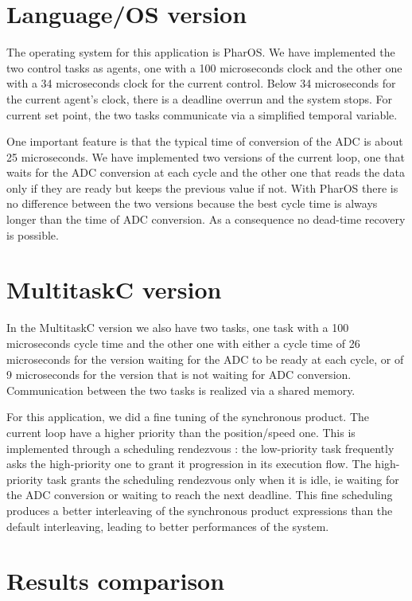\documentclass[10pt]{report}
\begin{document}
\section{Language/OS version}

The operating system for this application is PharOS. We have implemented the two control tasks as agents,
one with a 100 microseconds clock and the other one with a 34 microseconds clock for the current control. 
Below 34 microseconds for the current agent's clock, there is a deadline overrun and the system stops. 
For current set point, the two tasks communicate via a simplified temporal variable.

One important feature is that the typical time of conversion of the ADC is about 25 microseconds. We
have implemented two versions of the current loop, one that waits for the ADC conversion at each cycle
and the other one that reads the data only if they are ready but keeps the previous value if not. With
PharOS there is no difference between the two versions because the best cycle time is always longer than
the time of ADC conversion. As a consequence no dead-time recovery is possible.

\section{MultitaskC version}

In the MultitaskC version we also have two tasks, one task with a 100 microseconds cycle time and the other one
with either a cycle time of 26 microseconds for the version waiting for the ADC to be ready at each cycle, or 
of 9 microseconds for the version that is not waiting for ADC conversion. Communication between the two
tasks is realized via a shared memory.

For this application, we did a fine tuning of the synchronous product. The current loop have a higher priority
than the position/speed one. This is implemented through a scheduling rendezvous : the low-priority task frequently 
asks the high-priority one to grant it progression in its execution flow. The high-priority task grants the scheduling 
rendezvous only when it is idle, ie waiting for the ADC conversion or waiting to reach the next deadline. 
This fine scheduling produces a better interleaving of the synchronous product expressions than the default interleaving, 
leading to better performances of the system.

\section{Results comparison}
\end{document}
